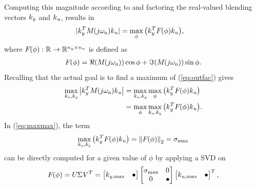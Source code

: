 \documentclass[aerospace,article,submit,moreauthors,pdftex,10pt,a4paper]{Definitions/mdpi}
\begin{document}
Computing this magnitude according to \cite{Pusch18a} and factoring the real-valued blending vectors $\aevec{k}{y}$ and $\aevec{k}{u}$, results in
%
\begin{align}
\label{eq:outfac}
\begin{split}
|\aevec{k}{y}^T \aemat{M}{}(j\omega_{\text{n}}) \aevec{k}{u}|
&=
\max_{\phi} 
\big(
\aevec{k}{y}^T  \aemat{F}{}(\phi) \aevec{k}{u} 
\big),
\end{split}
\end{align}
%
where $\aemat{F}{}(\phi) : \mathbb{R} \rightarrow \mathbb{R}^{n_y \times n_u}$ is defined as
%
\begin{align}
\label{eq:F}
\aemat{F}{}(\phi)=
\Re{(\aemat{M}{}(j\omega_{\text{n}}))} \cos \phi + 
\Im{(\aemat{M}{}(j\omega_{\text{n}}))} \sin \phi .
\end{align}
%
Recalling that the actual goal is to find a maximum of (\ref{eq:outfac}) gives
%
\begin{align}
\begin{split}
\label{eq:maxmax}
\max_{\aevec{k}{u},\aevec{k}{y}} 
\left|  \aevec{k}{y}^T \aemat{M}{}(j\omega_{\text{n}}) \aevec{k}{u} \right|
&=
\max_{\aevec{k}{u},\aevec{k}{y}} \max_{\phi}
\big( 
\aevec{k}{y}^T  \aemat{F}{}(\phi) \aevec{k}{u} 
\big)
\\
&=
\max_{\phi} \max_{\aevec{k}{u},\aevec{k}{y}} 
\big( 
\aevec{k}{y}^T  \aemat{F}{}(\phi) \aevec{k}{u} 
\big).
\end{split}
\end{align}
% 
In (\ref{eq:maxmax}), the term
%
\begin{align}
\label{eq:sigmaMax}
\max_{\aevec{k}{u},\aevec{k}{y}} 
\left( 
\aevec{k}{y}^T  \aemat{F}{}(\phi) \aevec{k}{u} 
\right)
=
\norm{\aemat{F}{}(\phi)}{2}
=
\sigma_{\text{max}}
\end{align}
%
can be directly computed for a given value of $\phi$ by applying a \ac{SVD} on
%
\begin{align}
\label{eq:svd}
\aemat{F}{}(\phi)
=
\aemat{U}{} \aemat{\Sigma}{} \aemat{V}{}^T
=
\begin{bmatrix}
\aevec{k}{y,\text{max}} & \bullet 
\end{bmatrix}
\begin{bmatrix} 
\aesym{\sigma}{\text{max}} & \aemat{0}{} \\ \aemat{0}{} & \bullet 
\end{bmatrix}
\begin{bmatrix}
\aemat{k}{u,\text{max}} & \bullet
\end{bmatrix}^T,
\end{align}
\end{document}
